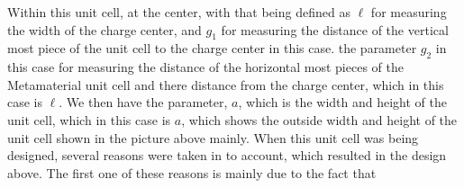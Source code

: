 \documentclass[]{article}
\begin{document}
\begin{figure}[H]
\end{figure}
\noindent
Within this unit cell, at the center, with that being defined as $\ell$ for measuring the width of the charge center, and $g_1$ for measuring the distance of the vertical most piece of the unit cell to the charge center in this case. the parameter $g_2$ in this case for measuring the distance of the horizontal most pieces of the Metamaterial unit cell and there distance from the charge center, which in this case is $\ell$. We then have the parameter, $a$, which is the width and height of the unit cell, which in this case is $a$, which shows the outside width and height of the unit cell shown in the picture above mainly. When this unit cell was being designed, several reasons were taken in to account, which resulted in the design above. The first one of these reasons is mainly due to the fact that 
\end{document}
